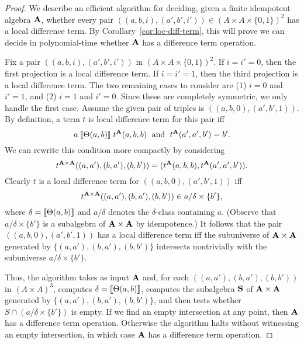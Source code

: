 \begin{proof}
  We describe an efficient algorithm for deciding,
  given a finite idempotent algebra $\mathbf{A}$,
  whether every pair $((a,b,i), (a',b',i')) \in (A\times A \times \{0,1\})^2$ has a local
  difference term.  By Corollary~\ref{cor:loc-diff-term}, this will prove we
  can decide in polynomial-time whether $\mathbf{A}$ has a difference term operation.

  Fix a pair
  $((a,b,i), (a',b',i'))$ in $(A\times A \times \{0,1\})^2$. If $i = i' = 0$,
  then the first projection is a local difference term. If $i = i' = 1$,  
    then the third projection is a local difference term. The two remaining cases to
    consider are (1) $i = 0$ and $i'=1$, and (2)
    $i = 1$ and $i'=0$. Since these are completely symmetric, we only handle the
    first case. Assume  the given pair of triples is
    $((a,b,0), (a',b',1))$.  By definition, a term $t$ is local difference term
    for this pair iff
    \[
    a\mathrel{\llbracket \Theta(a,b) \rrbracket} t^{\mathbf{A}}(a,b,b) \; \text{ and } \;
    t^{\mathbf{A}}(a',a',b') = b'.
    \]
    We can rewrite this condition more compactly by
    considering 
    \[t^{\mathbf{A}\times \mathbf{A}}((a,a'), (b,a'), (b,b')) =
    (t^{\mathbf{A}}(a,b,b),t^{\mathbf{A}}(a',a',b')).\]
    Clearly $t$ is a local difference term for
    $((a,b,0), (a',b',1))$ iff
    \[
    t^{\mathbf{A}\times \mathbf{A}}((a,a'), (b,a'), (b,b'))\in a/\delta \times \{b'\},
    \]
    where $\delta = \llbracket \Theta(a,b) \rrbracket$ and $a/\delta$ denotes the
    $\delta$-class containing $a$.
    (Observe that $a/\delta \times \{b'\}$ is a subalgebra of $\mathbf{A} \times \mathbf{A}$
    by idempotence.)
    It follows that the pair
    $((a,b,0), (a',b',1))$ has a local difference term iff
    the subuniverse of $\mathbf{A}\times \mathbf{A}$ generated by
    $\{(a,a'), (b,a'), (b,b')\}$ intersects nontrivially with the subuniverse
    $a/\delta \times \{b'\}$.

    Thus, the algorithm takes as input $\mathbf{A}$ and, for each 
    $((a,a'), (b,a'), (b,b'))$ in $(A\times A)^3$, computes
    $\delta = \llbracket \Theta(a,b) \rrbracket$, computes the subalgebra
    $\mathbf{S}$ of $\mathbf{A}\times \mathbf{A}$ generated by
    $\{(a,a'), (b,a'), (b,b')\}$, and then
    tests whether $S \cap (a/\delta \times \{b'\})$ is empty.
    If we find an empty intersection at any point, then
    $\mathbf{A}$ has a difference term operation.
    Otherwise the algorithm halts without witnessing an empty
    intersection, in which case $\mathbf{A}$ has a difference term operation.


\end{proof}
